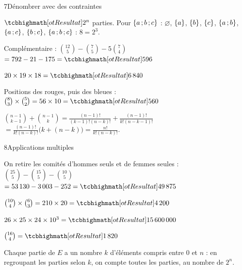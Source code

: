 \begin{deuxcolonnes}
\begin{corrige}{7}{Dénombrer avec des contraintes}
\begin{questions}
  \item $\res{2^{n}}$ parties. Pour $\left\{a\,{;}\, b\,{;}\, c\right\}$ : $\varnothing$, $\left\{a\right\}$, $\left\{b\right\}$, $\left\{c\right\}$, $\left\{a\,{;}\, b\right\}$, $\left\{a\,{;}\, c\right\}$,
    $\left\{b\,{;}\, c\right\}$, $\left\{a\,{;}\, b\,{;}\, c\right\}$ : $8=2^{3}$.
  \item Complémentaire : $\binom{12}5-\binom75-5\binom74$\\ $=792-21-175=\res{596}$
  \item $20\times19\times18=\res{6\,840}$
  \item Positions des rouges, puis des bleues :\\ $\binom83\times\binom52=56\times10=\res{560}$
  \item $\binom{n-1}{k-1}+\binom{n-1}{k}=\frac{(n-1)!}{(k-1)!(n-k)!}+\frac{(n-1)!}{k!(n-k-1)!}$\\
    $=\frac{(n-1)!}{k!(n-k)!}\big(k+(n-k)\big)=\frac{n!}{k!(n-k)!}$.
\end{questions}
\end{corrige}

\begin{corrige}{8}{Applications multiples}
\begin{questions}
  \item On retire les comités d'hommes seuls et de femmes seules :\\ $\binom{25}5-\binom{15}5-\binom{10}5$\\ $=53\,130-3\,003-252=\res{49\,875}$
  \item $\binom{10}4\times\binom63=210\times20=\res{4\,200}$
  \item $26\times25\times24\times10^{3}=\res{15\,600\,000}$
  \item $\binom{16}4=\res{1\,820}$
  \item Chaque partie de $E$ a un nombre $k$ d'éléments compris entre $0$ et $n$ : en regroupant les parties selon $k$, on compte
    toutes les parties, au nombre de $2^{n}$.
\end{questions}
\end{corrige}

\end{deuxcolonnes}

